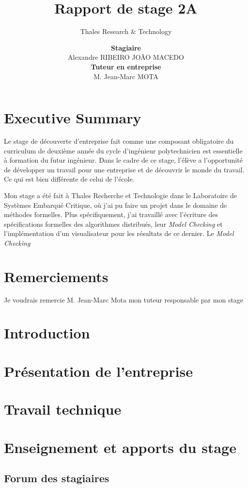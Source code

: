 \documentclass[a4paper, 10pt]{article} %
\begin{document}
\title{Rapport de stage 2A}
\subtitle{Thales Research \& Technology}
\author{
\begin{tabular}{ccc}
	\textbf{Stagiaire}
	\\
	Alexandre RIBEIRO JOÃO MACEDO
	\\	
	\textbf{Tuteur en entreprise} 
	\\
	M. Jean-Marc MOTA
\end{tabular}
}

\maketitle

\section{Executive Summary}
Le stage de découverte d'entreprise fait comme une composant obligatoire du curriculum de deuxième année du cycle d'ingénieur polytechnicien est essentielle à formation du futur ingénieur. Dans le cadre de ce stage, l'élève a l'opportunité de développer un travail pour une entreprise et de découvrir le monde du travail. Ce qui est bien différente de celui de l'école.

Mon stage a été fait à Thales Recherche et Technologie dans le Laboratoire de Systèmes Embarqué Critique, où j'ai pu faire un projet dans le domaine de méthodes formelles. Plus spécifiquement, j'ai travaillé avec l'écriture des spécifications formelles des algorithmes distribués, leur \textit{Model Checking} et l'implémentation d'un visualisateur pour les résultats de ce dernier. Le \textit{Model Checking} 

\newpage
\section{Remerciements}
Je voudrais remercie M. Jean-Marc Mota mon tuteur responsable par mon stage

\newpage
\tableofcontents

\newpage
\section{Introduction}

\newpage
\section{Présentation de l'entreprise}

\newpage
\section{Travail technique}

\newpage
\section{Enseignement et apports du stage}
\subsection{Forum des stagiaires}
\end{document}
